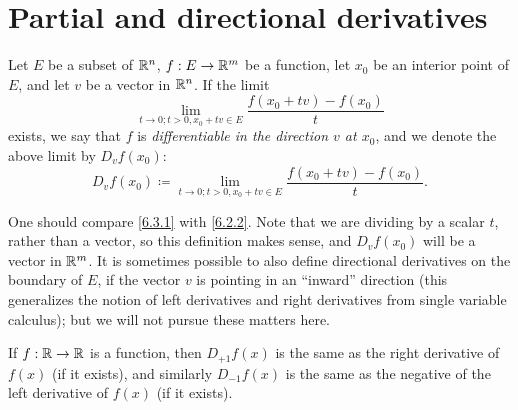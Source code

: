 \section{Partial and directional derivatives}\label{sec:6.3}

\begin{defn}\label{6.3.1}
  Let \(E\) be a subset of \(\mathbb{R}^n\), \(f : E \to \mathbb{R}^m\) be a function, let \(x_0\) be an interior point of \(E\), and let \(v\) be a vector in \(\mathbb{R}^n\).
  If the limit
  \[
    \lim_{t \to 0 ; t > 0, x_0 + tv \in E} \frac{f(x_0 + tv) - f(x_0)}{t}
  \]
  exists, we say that \(f\) is \emph{differentiable in the direction \(v\) at \(x_0\)}, and we denote the above limit by \(D_v f(x_0)\):
  \[
    D_v f(x_0) \coloneqq \lim_{t \to 0 ; t > 0, x_0 + tv \in E} \frac{f(x_0 + tv) - f(x_0)}{t}.
  \]
\end{defn}

\begin{rmk}\label{6.3.2}
  One should compare \cref{6.3.1} with \cref{6.2.2}.
  Note that we are dividing by a scalar \(t\), rather than a vector, so this definition makes sense, and \(D_v f(x_0)\) will be a vector in \(\mathbb{R}^m\).
  It is sometimes possible to also define directional derivatives on the boundary of \(E\), if the vector \(v\) is pointing in an ``inward'' direction
  (this generalizes the notion of left derivatives and right derivatives from single variable calculus);
  but we will not pursue these matters here.
\end{rmk}

\begin{eg}\label{6.3.3}
  If \(f : \mathbb{R} \to \mathbb{R}\) is a function, then \(D_{+1} f(x)\) is the same as the right derivative of \(f(x)\) (if it exists), and similarly \(D_{-1} f(x)\) is the same as the negative of the left derivative of \(f(x)\) (if it exists).
\end{eg}

